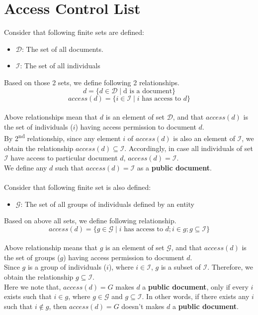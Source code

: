 \documentclass{article}
\begin{document}
\section{Access Control List}
\noindent
Consider that following finite sets are defined:
\begin{itemize}
    \item $\mathcal{D}$: The set of all documents.
    \item $\mathcal{I}$: The set of all individuals
\end{itemize}
Based on those 2 sets, we define following 2 relationships.
\[ d = \{ d \in \mathcal{D} \mid \text{d is a document} \} \]
\[ access(d) = \{ i \in \mathcal{I} \mid i \text{ has access to } d \} \] \\ 
\noindent
Above relationships mean that $d$ is an element of set $\mathcal{D}$, and that $access(d)$ is the set of individuals ($i$) having access permission to document $d$.\\ 
By 2\textsuperscript{nd} relationship, since any element $i$ of $access(d)$ is also an element of $\mathcal{I}$, we obtain the relationship $access(d) \subseteq \mathcal{I}$. Accordingly, in case all individuals of set $\mathcal{I}$ have access to particular document $d$, $access(d) = \mathcal{I}$.\\
We define any $d$ such that $access(d) = \mathcal{I}$ as a \textbf{public document}. \\ \\

\noindent
Consider that following finite set is also defined:
\begin{itemize}
    \item $\mathcal{G}$: The set of all groups of individuals defined by an entity
\end{itemize}
Based on above all sets, we define following relationship.
\[ access(d) = \{ g \in \mathcal{G} \mid i \text{ has access to } d; i \in g; g \subseteq \mathcal{I} \} \] \\ 
\noindent
Above relationship means that $g$ is an element of set $\mathcal{G}$, and that $access(d)$ is the set of groups ($g$) having access permission to document $d$.\\ 
Since $g$ is a group of individuals ($i$), where $i \in \mathcal{I}$, $g$ is a subset of $\mathcal{I}$. Therefore, we obtain the relationship $g \subseteq \mathcal{I}$.\\
Here we note that, $access(d) = G$ makes $d$ a \textbf{public document}, only if every $i$ exists such that $i \in g$, where $g \in \mathcal{G}$ and $g \subseteq \mathcal{I}$. 
In other words, if there exists any $i$ such that $i \notin g$, then $access(d) = G$ doesn't makes $d$ a \textbf{public document}. \\ \\
\end{document}
